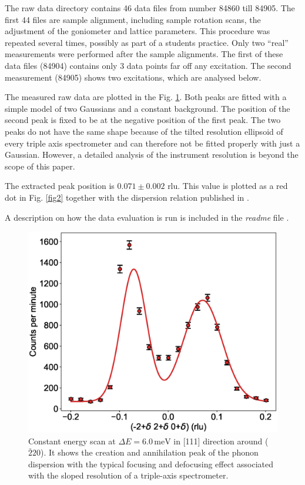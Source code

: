 \documentclass[aps,pra,reprint,amsmath,amssymb,superscriptaddress,showkeys]{revtex4-1}
\begin{document}
The raw data directory contains 46 data files from number 84860 till 84905. 
The first 44 files are sample alignment, including sample rotation scans, the adjustment of the goniometer and lattice parameters. 
This procedure was repeated several times, possibly as part of a students practice.
Only two ``real'' measurements were performed after the sample alignments.
The first of these data files (84904) contains only 3 data points far off any excitation.
The second measurement (84905) shows two excitations, which are analysed below.

The measured raw data are plotted in the Fig. \ref{fig1}.
Both peaks are fitted with a simple model of two Gaussians and a constant background. 
The position of the second peak is fixed to be at the negative position of the first peak. 
The two peaks do not have the same shape because of the tilted resolution ellipsoid of every triple axis spectrometer and can therefore not be fitted properly with just a Gaussian. 
However, a detailed analysis of the instrument resolution is beyond the scope of this paper.

The extracted peak position is $0.071 \pm  0.002$ rlu. 
This value is plotted as a red dot in Fig. \ref{fig2} together with the dispersion relation published in \cite{Aouissi}.

A description on how the data evaluation is run is included in the \emph{readme} file \cite{data-evaluation}.


\begin{figure}
    \includegraphics[width=1.0\linewidth]{energy-scan.eps}
    \caption{\label{fig1} Constant energy scan at $\Delta E = 6.0\,\mathrm{meV}$ in [111] direction around ($\bar{2}20$). It shows the creation and annihilation peak of the phonon dispersion with the typical focusing and defocusing effect associated with the sloped resolution of a triple-axis spectrometer.}
\end{figure}
\end{document}

